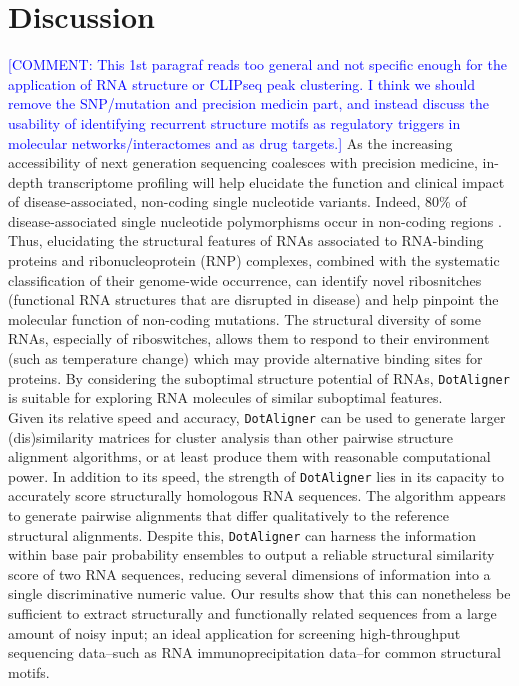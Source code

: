 \documentclass{bmcart}
\newcommand\dotaligner{\texttt{DotAligner}}
\begin{document}
\section*{Discussion}

\textcolor{blue} {[COMMENT: This 1st paragraf reads too general and not specific enough for the application of RNA structure or CLIPseq peak clustering. I think we should remove the SNP/mutation and precision medicin part, and instead discuss the usability of identifying  recurrent structure motifs as regulatory triggers in molecular networks/interactomes and as drug targets.]} 
As the increasing accessibility of next generation sequencing coalesces with
precision medicine, in-depth transcriptome profiling will help elucidate the
function and clinical impact of disease-associated, non-coding single
nucleotide variants. Indeed, 80\% of disease-associated single nucleotide
polymorphisms occur in non-coding regions
\cite{hindorff2009potential,ritchie2014functional}. Thus, elucidating the
structural features of RNAs associated to RNA-binding proteins and
ribonucleoprotein (RNP) complexes, combined with the systematic classification of
their genome-wide occurrence, can identify novel ribosnitches (functional RNA
structures that are disrupted in disease) and help pinpoint the molecular
function of non-coding mutations. The structural diversity of some RNAs,
especially of riboswitches, allows them to respond to their environment (such
as temperature change) which may provide alternative binding sites for
proteins. By considering the suboptimal structure potential of RNAs, \dotaligner{}
is suitable for exploring RNA molecules of similar suboptimal features. \\

Given its relative speed and accuracy, \dotaligner{} can be used to generate
larger (dis)similarity matrices for cluster analysis than other pairwise
structure alignment algorithms, or at least produce them with reasonable
computational power. In addition to its speed, the strength of \dotaligner{} lies in
its capacity to accurately score structurally homologous RNA sequences. The
algorithm appears to generate pairwise alignments that differ qualitatively to the
reference structural alignments. Despite this, \dotaligner{} can harness the
information within base pair probability ensembles to output a reliable
structural similarity score of two RNA sequences, reducing several dimensions 
of information  into a single discriminative numeric value.
 Our results show that this can nonetheless be sufficient to extract structurally and functionally related
sequences from a large amount of noisy input; an ideal application for
screening high-throughput sequencing data--such as RNA immunoprecipitation
data--for common structural motifs. \\
\end{document}

